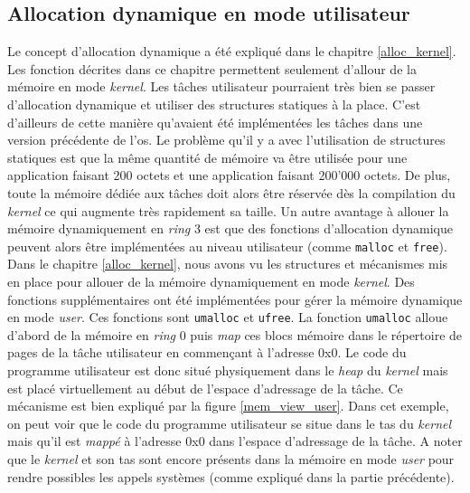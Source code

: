 
\subsection{Allocation dynamique en mode utilisateur}
\label{alloc_user}
Le concept d'allocation dynamique a été expliqué dans le chapitre \ref{alloc_kernel}.
Les fonction décrites dans ce chapitre permettent seulement d'allour de la mémoire
en mode \textit{kernel}. Les tâches utilisateur pourraient très bien se passer
d'allocation dynamique et utiliser des structures statiques à la place. C'est
d'ailleurs de cette manière qu'avaient été implémentées les tâches dans une version
précédente de l'\acrshort{os}. Le problème qu'il y a avec l'utilisation de structures
statiques est que la même quantité de mémoire va être utilisée pour une application
faisant 200 octets et une application faisant 200'000 octets. De plus, toute la
mémoire dédiée aux tâches doit alors être réservée dès la compilation du \textit{kernel}
ce qui augmente très rapidement sa taille. Un autre avantage à allouer la mémoire
dynamiquement en \textit{ring} 3 est que des fonctions d'allocation dynamique 
peuvent alors être implémentées au niveau utilisateur (comme \texttt{malloc}
et \texttt{free}). \\

Dans le chapitre \ref{alloc_kernel}, nous avons vu les structures et mécanismes
mis en place pour allouer de la mémoire dynamiquement en mode \textit{kernel}.
Des fonctions supplémentaires ont été implémentées pour gérer la mémoire dynamique en
mode \textit{user}. Ces fonctions sont \texttt{umalloc} et
\texttt{ufree}. La fonction \texttt{umalloc} alloue d'abord
de la mémoire en \textit{ring} 0 puis \textit{map} ces blocs mémoire
dans le répertoire de pages de la tâche utilisateur en commençant à l'adresse 0x0.
Le code du programme utilisateur est donc situé physiquement dans le \textit{heap}
du \textit{kernel} mais est placé virtuellement au début de l'espace d'adressage
de la tâche. Ce mécanisme est bien expliqué par la figure \ref{mem_view_user}.
Dans cet exemple, on peut voir que le code du programme utilisateur se situe
dans le tas du \textit{kernel} mais qu'il est \textit{mappé} à l'adresse 0x0
dans l'espace d'adressage de la tâche. A noter que le \textit{kernel} et son tas
sont encore présents dans la mémoire en mode \textit{user} pour rendre possibles
les appels systèmes (comme expliqué dans la partie précédente).

